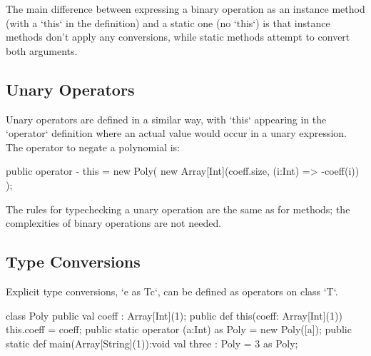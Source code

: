 The main difference between expressing a binary operation as an instance
method (with a \xcd`this` in the definition) and a static one (no \xcd`this`)
is that instance methods don't apply any conversions, while static methods
attempt to convert both arguments. 




\subsection{Unary Operators}

Unary operators are defined in a similar way, with \xcd`this` appearing in the
\xcd`operator` definition where an actual value would occur in a unary
expression.  The operator to negate a polynomial is: 

\begin{xten}
  public operator - this = new Poly(
    new Array[Int](coeff.size, (i:Int) => -coeff(i))
    );
\end{xten}

The rules for typechecking a unary operation are the same as for methods; the
complexities of binary operations are not needed.



\subsection{Type Conversions}

Explicit type conversions, \xcd`e as T{c}`, can be defined as operators on
class \xcd`T`.

\begin{xten}
class Poly {
  public val coeff : Array[Int](1);
  public def this(coeff: Array[Int](1)) { this.coeff = coeff;}
  public static operator (a:Int) as Poly = new Poly([a]);
  public static def main(Array[String](1)):void {
     val three : Poly = 3 as Poly;
  }
}
\end{xten}
%


